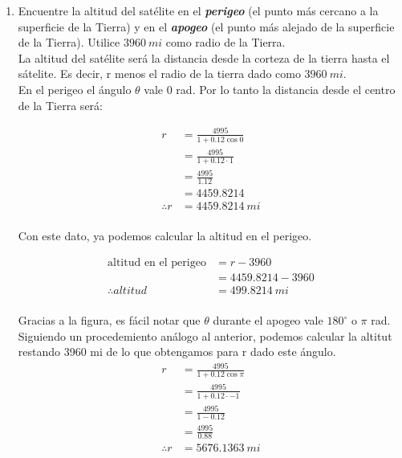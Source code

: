 \documentclass[12pt]{article}
\begin{document}
\begin{enumerate}
\item Encuentre la altitud del satélite en el \textit{\textbf{perigeo}} (el punto más cercano a la superficie de la Tierra) y en el \textit{\textbf{apogeo}} (el punto más alejado de la superficie de la Tierra). Utilice $3960~  mi$ como radio de la Tierra.\\
La altitud del satélite será la distancia desde la corteza de la tierra hasta el sátelite. Es decir, r menos el radio de la tierra dado como $3960~  mi$.\\ En el perigeo el ángulo $\theta$ vale 0 rad. Por lo tanto la distancia desde el centro de la Tierra será:
 
\begin{equation*}
  \begin{split}
    r
    &= \frac{4995}{1+0.12\cos{0}}\\
    &= \frac{4995}{1+0.12\cdot 1}\\
    &= \frac{4995}{1.12}\\
    &= 4459.8214\\
    \therefore
    r
    &= 4459.8214 ~ mi  \\
  \end{split}
\end{equation*}

Con este dato, ya podemos calcular la altitud en el perigeo.

\begin{equation*}
  \begin{split}
    \text{altitud en el perigeo}
    &= r - 3960 \\
    &= 4459.8214 - 3960\\
    \therefore
    altitud
    &= 499.8214 ~ mi  \\
  \end{split}
\end{equation*}

Gracias a la figura, es fácil notar que $\theta$ durante el apogeo vale $180^{\circ}$ o  $\pi$ rad. Siguiendo un procedemiento análogo al anterior, podemos calcular la altitut restando 3960 mi de lo que obtengamos para r dado este ángulo.
\begin{equation*}
  \begin{split}
    r
    &= \frac{4995}{1+0.12\cos{\pi}}\\
    &= \frac{4995}{1+0.12\cdot -1}\\
    &= \frac{4995}{1 - 0.12}\\
    &= \frac{4995}{0.88}\\
    \therefore
    r
    &= 5676.1363 ~ mi \\
  \end{split}
\end{equation*}


\end{enumerate}
\end{document}

